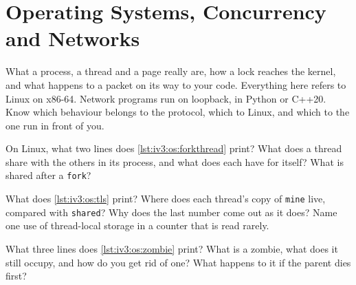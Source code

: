 \chapter{Operating Systems, Concurrency and Networks}\label{ch:iv3:operating-systems-concurrency-and-networks}

\begin{ivtrains}
What a process, a thread and a page really are, how a lock reaches the kernel, and what happens to a packet on its way to your code. Everything here refers to Linux on x86-64. Network programs run on loopback, in Python or C++20. Know which behaviour belongs to the protocol, which to Linux, and which to the one run in front of you.
\end{ivtrains}

\begin{question}\label{iq:iv3:operating-systems-concurrency-and-networks:1}
On Linux, what two lines does \cref{lst:iv3:os:forkthread} print? What does a thread share with the others in its process, and what does each have for itself? What is shared after a \texttt{fork}?
\label{lst:iv3:os:forkthread}
\end{question}

\begin{question}\label{iq:iv3:operating-systems-concurrency-and-networks:2}
What does \cref{lst:iv3:os:tls} print? Where does each thread's copy of \texttt{mine} live, compared with \texttt{shared}? Why does the last number come out as it does? Name one use of thread-local storage in a counter that is read rarely.
\label{lst:iv3:os:tls}
\end{question}

\begin{question}\label{iq:iv3:operating-systems-concurrency-and-networks:3}
What three lines does \cref{lst:iv3:os:zombie} print? What is a zombie, what does it still occupy, and how do you get rid of one? What happens to it if the parent dies first?
\label{lst:iv3:os:zombie}
\end{question}

